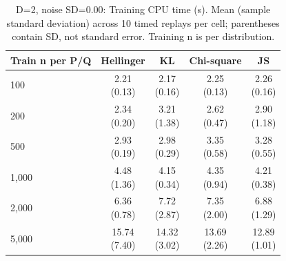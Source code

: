 
\begin{table}[t]
\centering
\small
\setlength{\tabcolsep}{4pt}
\caption{D=2, noise SD=0.00: Training CPU time (s). Mean (sample standard deviation) across 10 timed replays per cell; parentheses contain SD, not standard error. Training n is per distribution.}
\label{tab:sim-d-2-noise-sd-0-00-training-cpu-time-s}
\begin{tabular}{lcccc}
\toprule
Train n per P/Q & Hellinger & KL & Chi-square & JS \\
\midrule
100 & \shortstack{2.21\\(0.13)} & \shortstack{2.17\\(0.16)} & \shortstack{2.25\\(0.13)} & \shortstack{2.26\\(0.16)} \\
200 & \shortstack{2.34\\(0.20)} & \shortstack{3.21\\(1.38)} & \shortstack{2.62\\(0.47)} & \shortstack{2.90\\(1.18)} \\
500 & \shortstack{2.93\\(0.19)} & \shortstack{2.98\\(0.29)} & \shortstack{3.35\\(0.58)} & \shortstack{3.28\\(0.55)} \\
1,000 & \shortstack{4.48\\(1.36)} & \shortstack{4.15\\(0.34)} & \shortstack{4.35\\(0.94)} & \shortstack{4.21\\(0.38)} \\
2,000 & \shortstack{6.36\\(0.78)} & \shortstack{7.72\\(2.87)} & \shortstack{7.35\\(2.00)} & \shortstack{6.88\\(1.29)} \\
5,000 & \shortstack{15.74\\(7.40)} & \shortstack{14.32\\(3.02)} & \shortstack{13.69\\(2.26)} & \shortstack{12.89\\(1.01)} \\
\bottomrule
\end{tabular}
\end{table}

